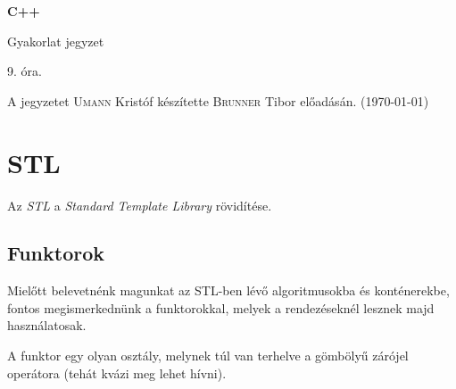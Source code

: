 \documentclass[a4paper,11.5pt]{article}
\begin{document}
	\setlength\parindent{0pt}
	\def\s{\hspace{0.2mm}\vphantom{\beta}}
	\def\Z{\mathbb{Z}}
	\def\Q{\mathbb{Q}}
	\def\R{\mathbb{R}}
	\def\C{\mathbb{C}}
	\def\N{\mathbb{N}}
	\def\Ra{\overline{\mathbb{R}}}
	
	\def\sume{\displaystyle\sum_{n=1}^{+\infty}}
	\def\sumn{\displaystyle\sum_{n=0}^{+\infty}}
	
	\def\narrow{\underset{n\rightarrow+\infty}{\longrightarrow}}
	\def\limn{\displaystyle\lim_{n\to +\infty}}
	\def\limx{\displaystyle\lim_{x\to +\infty}}
	
	\theoremstyle{definition}
	\newtheorem{theorem}{Tétel}[subsection] 
	
	\theoremstyle{definition}
	\newtheorem{definition}[theorem]{Definíció} 
	\newtheorem{example}[theorem]{Példa} 
	\newtheorem{task}[theorem]{Feladat} 
	\newtheorem{note}[theorem]{Megjegyzés}
	\begin{center}
		{\LARGE\textbf{C++}}
		
		{\Large Gyakorlat jegyzet}
		
		9. óra.
	\end{center}
	A jegyzetet \textsc{Umann} Kristóf készítette \textsc{Brunner} Tibor  előadásán. (\today)
	
	\section{STL}

	Az \textit{STL} a \textit{Standard Template Library} rövidítése.
	\subsection{Funktorok}
	Mielőtt belevetnénk magunkat az STL-ben lévő algoritmusokba és konténerekbe, fontos megismerkednünk a funktorokkal, melyek a rendezéseknél lesznek majd használatosak.
	\medskip
	
	A funktor egy olyan osztály, melynek túl van terhelve a gömbölyű zárójel operátora (tehát kvázi meg lehet hívni).
	
\end{document}
